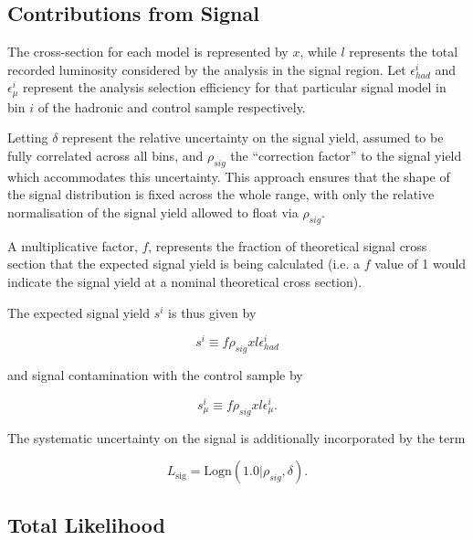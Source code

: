 \subsection{Contributions from Signal}
\label{subsec:signalcontribution}

The cross-section for each model is represented by $x$, while $l$ represents the total recorded luminosity considered by the analysis in the signal region. Let $\epsilon^{i}_{had}$ and $\epsilon^{i}_{\mu}$ represent the analysis selection efficiency for that particular signal model in \theht bin $i$ of the hadronic and \mupjets control sample respectively. 

Letting $\delta$ represent the relative uncertainty on the signal yield, assumed to be fully correlated across all bins, and $\rho_{sig}$ the ``correction factor'' to the signal yield which accommodates this uncertainty. This approach ensures that the shape of the signal distribution is fixed across the whole \theht range, with only the relative normalisation of the signal yield allowed to float via $\rho_{sig}$. 

A multiplicative factor, $f$, represents the fraction of theoretical signal cross section that the expected signal yield is being calculated (i.e. a $f$ value of 1 would indicate the signal yield at a nominal theoretical cross section).

The expected signal yield $s^{i}$ is thus given by

\begin{equation}
s^{i} \equiv f\rho_{sig}xl\epsilon^{i}_{had}
\end{equation}

and signal contamination with the \mupjets control sample by

\begin{equation}
s^{i}_{\mu} \equiv f\rho_{sig}xl\epsilon^{i}_{\mu}.
\end{equation}

The systematic uncertainty on the signal is additionally incorporated by the term

\begin{equation}
L_{\text{sig}} = \text{Logn}(1.0|\rho_{sig},\delta).
\end{equation}

\subsection{Total Likelihood}
\label{subsec:totallikelihood}

